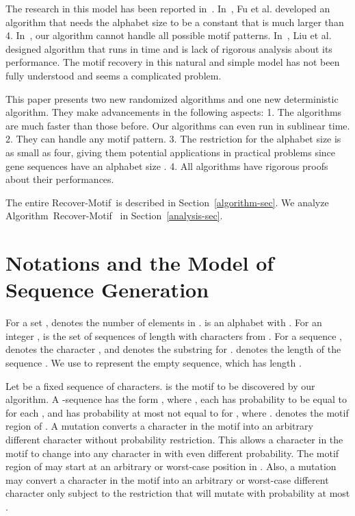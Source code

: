 \documentclass[11pt]{article}
\newcommand{\algmnam}{Recover-Motif}
\newcommand{\algmname}{Algorithm~\algmnam}
\newcommand{\algma}{\algmname~}
\begin{document}
The research in this model has been reported
in~\cite{FuKaoWang09b,FuKaoWang08b,LiuMaWang08}.
In~\cite{FuKaoWang09b}, Fu et al. developed an algorithm that needs
the alphabet size to be a constant that is much larger than 4.
In~\cite{FuKaoWang08b}, our algorithm cannot handle all possible
motif patterns. In~\cite{LiuMaWang08}, Liu et al. designed algorithm
that runs in  time and is lack of rigorous analysis about
its performance. The motif recovery in this natural and simple model
has not been fully understood and seems a complicated problem.

This paper presents two new randomized algorithms and one new
deterministic algorithm. They make advancements in the following
aspects: 1. The algorithms are much faster than those before. Our
algorithms can even run in sublinear time. 2. They can handle any
motif pattern. 3. The restriction for the alphabet size is as small
as four, giving them potential applications in practical problems
since gene sequences have an alphabet size . 4. All algorithms
have rigorous proofs about their performances.

The entire \algmnam~is described in
Section~\ref{algorithm-sec}. We analyze \algma
in Section~\ref{analysis-sec}.


\section{Notations and the Model of Sequence Generation}\label{notation-sec}
For a set ,  denotes the number of elements in .
 is an alphabet with . For an integer
,  is the set of sequences of length  with
characters from . For a sequence ,
 denotes the character , and  denotes the
substring  for .  denotes
the length of the sequence .
We use  to represent the empty sequence, which has length
.

Let  be a fixed sequence of  characters. 
is the motif to be discovered by our algorithm. A
-sequence has the form , where ,
each  has probability  to be equal to  for
each , and  has probability at most  not
equal to  for , where .  denotes
the motif region  of . A mutation converts a
character  in  the motif into an arbitrary different character
 without probability restriction. This allows a character 
in the motif to change into any character  in 
with even different probability. The motif region of  may start
at an arbitrary or worst-case position in . Also, a mutation may
convert a character  in the motif into an arbitrary or
worst-case different character  only subject to the restriction
that  will mutate with probability at most .
\end{document}
